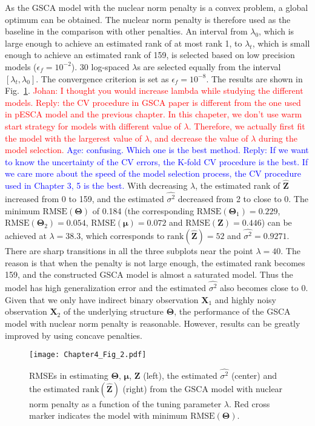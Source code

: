As the GSCA model with the nuclear norm penalty is a convex problem, a global optimum can be obtained. The nuclear norm penalty is therefore used as the baseline in the comparison with other penalties. An interval from $\lambda_0$, which is large enough to achieve an estimated rank of at most rank 1, to $\lambda_{t}$, which is small enough to achieve an estimated rank of 159, is selected based on low precision models ($\epsilon_f=10^{-2}$). 30 log-spaced $\lambda$s are selected equally from the interval $[\lambda_{t},\lambda_{0}]$. The convergence criterion is set as $\epsilon_f = 10^{-8}$. The results are shown in Fig.~\ref{chapter4_fig:2}. \textcolor{red}{Johan: I thought you would increase lambda while studying the different models. Reply: the CV procedure in GSCA paper is different from the one used in pESCA model and the previous chapter. In this chapeter, we don't use warm start strategy for models with different value of $\lambda$. Therefore, we actually first fit the model with the largerest value of $\lambda$, and decrease the value of $\lambda$ during the model selection.} \textcolor{blue}{Age: confusing. Which one is the best method. Reply: If we want to know the uncertainty of the CV errors, the K-fold CV procedure is the best. If we care more about the speed of the model selection process, the CV procedure used in Chapter 3, 5 is the best.} With decreasing $\lambda$, the estimated rank of $\hat{\mathbf{Z}}$ increased from 0 to 159, and the estimated $\hat{\sigma^2}$ decreased from 2 to close to 0. The minimum $\text{RMSE}(\mathbf{\Theta})$ of 0.184 (the corresponding $\text{RMSE}(\mathbf{\Theta}_1)=0.229$, $\text{RMSE}(\mathbf{\Theta}_2)=0.054$, $\text{RMSE}(\bm{\mu}) = 0.072$ and $\text{RMSE}(\mathbf{Z})=0.446$) can be achieved at $\lambda=38.3$, which corresponds to $\text{rank}(\hat{\mathbf{Z}})=52$ and $\hat{\sigma^2}=0.9271$. There are sharp transitions in all the three subplots near the point $\lambda=40$. The reason is that when the penalty is not large enough, the estimated rank becomes 159, and the constructed GSCA model is almost a saturated model. Thus the model has high generalization error and the estimated $\hat{\sigma^2}$ also becomes close to 0. Given that we only have indirect binary observation $\mathbf{X}_1$ and highly noisy observation $\mathbf{X}_2$ of the underlying structure $\mathbf{\Theta}$, the performance of the GSCA model with nuclear norm penalty is reasonable. However, results can be greatly improved by using concave penalties.
\begin{figure}[htbp]
    \centering
    \texttt{[image: Chapter4\_Fig\_2.pdf]}
    \caption{RMSEs in estimating $\mathbf{\Theta}$, $\bm{\mu}$, $\mathbf{Z}$ (left), the estimated $\hat{\sigma^2}$ (center) and the estimated $\text{rank}(\hat{\mathbf{Z}})$ (right) from the GSCA model with nuclear norm penalty as a function of the tuning parameter $\lambda$. Red cross marker indicates the model with minimum $\text{RMSE}(\mathbf{\Theta})$.}
    \label{chapter4_fig:2}
\end{figure}

